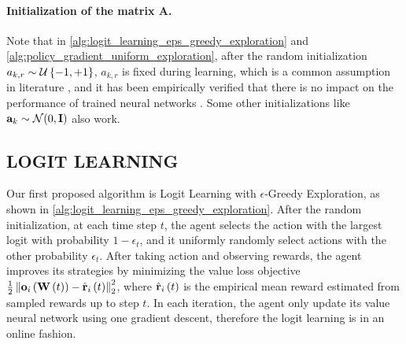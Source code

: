 \paragraph{Initialization of the matrix $\mathbf{A}$.} Note that in \cref{alg:logit_learning_eps_greedy_exploration} and \cref{alg:policy_gradient_uniform_exploration}, after the random initialization $a_{k,r} \sim {\mathcal{U}}\left\{-1, +1\right\}$, $a_{k,r}$ is fixed during learning, which is a common assumption in literature \citep{li2018learning,du2018gradientA,du2018gradientB,allen2018convergenceA,allen2018convergenceB}, and it has been empirically verified that there is no impact on the performance of trained neural networks \citep{hoffer2018fix}. Some other initializations like ${\mathbf{a}}_k \sim {\mathcal{N}}(0, {\mathbf{I}})$ also work.

\subsection{LOGIT LEARNING}
\label{subsec:logit_learning}

Our first proposed algorithm is Logit Learning with $\epsilon$-Greedy Exploration, as shown in \cref{alg:logit_learning_eps_greedy_exploration}. After the random initialization, at each time step $t$, the agent selects the action with the largest logit with probability $1 - \epsilon_t$, and it uniformly randomly select actions with the other probability $\epsilon_t$. After taking action and observing rewards, the agent improves its strategies by minimizing the value loss objective $\frac{1}{2} \left\| {\mathbf{o}}_i\left( {\mathbf{W}}\left(t\right)\right) - \hat{{\mathbf{r}}}_i\left(t\right) \right\|_2^2$, where $\hat{{\mathbf{r}}}_i\left(t\right)$ is the empirical mean reward estimated from sampled rewards up to step $t$. In each iteration, the agent only update its value neural network using one gradient descent, therefore the logit learning is in an online fashion.


